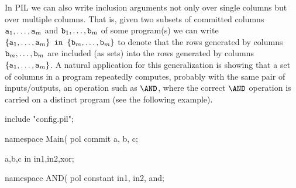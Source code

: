 In PIL we can also write inclusion arguments not only over single columns but over multiple columns. That is, given two subsets of committed columns $\mathtt{a}_1,\dots,\mathtt{a}_m$ and $\mathtt{b}_1,\dots,\mathtt{b}_m$ of some program(s) we can write $\{\mathtt{a}_1,\dots,\mathtt{a}_m\} \texttt{ in } \{\mathtt{b}_m,\dots,\mathtt{b}_m\}$ to denote that the rows generated by columns $\mathtt{b}_m,\dots,\mathtt{b}_m$ are included (as sets) into the rows generated by columns $\{\mathtt{a}_1,\dots,\mathtt{a}_m\}$. A natural application for this generalization is showing that a set of columns in a program repeatedly computes, probably with the same pair of inputs/outputs, an operation such as $\AND$, where the correct $\AND$ operation is carried on a distinct program (see the following example).
\begin{pil}
    include "config.pil";
    
    namespace Main(%
    pol commit a, b, c;
    
    {a,b,c} in {in1,in2,xor};
    
    namespace AND(%
    pol constant in1, in2, and;
\end{pil}


